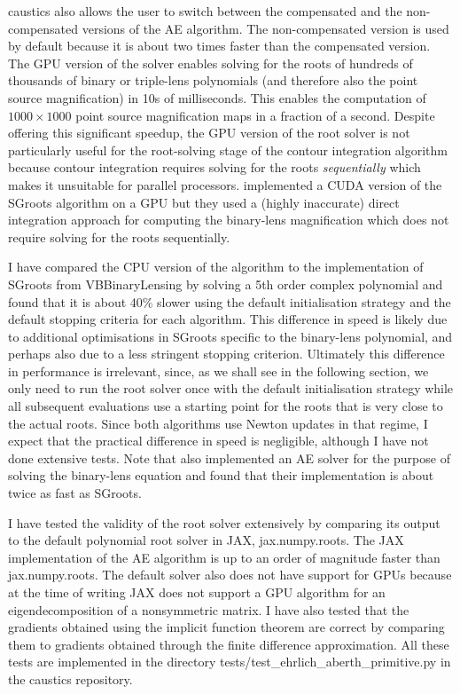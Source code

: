 \documentclass[12pt,dvipsnames]{report}
\newcommand{\ssf}[1]{\textsf{#1}}
\begin{document}
\ssf{caustics} also allows the user to switch between the compensated  and the non-compensated 
versions of the AE algorithm. The non-compensated version is used by default because 
it is about two times faster than the compensated version. The GPU version of the 
solver enables solving for the roots of hundreds of thousands of binary or triple-lens 
polynomials (and therefore also the point source magnification) in 10s of milliseconds.  
This enables the computation of $1000 \times 1000$ point source magnification maps 
in a fraction of a second. Despite offering this significant speedup, the GPU version of the 
root solver is not particularly useful for the root-solving stage of the contour integration 
algorithm because  contour integration requires solving for the roots \emph{sequentially}
which makes it unsuitable for parallel processors.
\citet{mcdougall2014} implemented a \ssf{CUDA} version of the \ssf{SGroots} algorithm 
on a GPU but they used  a (highly inaccurate) direct integration approach for 
computing the binary-lens magnification which does not require solving for the roots 
sequentially. 

I have compared the CPU version of the algorithm to the implementation of \ssf{SGroots} 
from \ssf{VBBinaryLensing} by solving a 5th order complex polynomial and found that 
it is about 40\% slower using the default initialisation strategy and the default 
stopping criteria for each algorithm. This difference in speed is likely due to additional 
optimisations in \ssf{SGroots} specific to the binary-lens polynomial, and perhaps also due 
to  a less stringent stopping criterion. Ultimately this difference in performance is 
irrelevant, since, as we shall see in the following section, we only need to run the 
root solver once  with the default initialisation strategy while all subsequent evaluations 
use a starting  point for the roots that is very close to the actual roots. 
Since both algorithms use Newton updates in that regime, I expect that the practical 
difference in speed is negligible, although I have not done extensive tests.  
Note that \citet{2022MNRAS.514.4379F} also implemented an AE solver for 
the purpose of solving the binary-lens equation and found that their implementation 
is about twice as fast as \ssf{SGroots}. 

I have tested the validity of the root solver extensively by comparing its output to the 
default polynomial root solver in \ssf{JAX}, \ssf{jax.numpy.roots}. The \ssf{JAX} 
implementation of the AE algorithm is up to an order of magnitude faster than 
\ssf{jax.numpy.roots}. The default solver also does not have support for GPUs because 
at the time of writing \ssf{JAX} does not support a GPU algorithm for an eigendecomposition 
of a nonsymmetric matrix.
I have also tested that the gradients obtained using the implicit function theorem are 
correct by comparing them to gradients obtained through the finite 
difference approximation. All these tests are implemented in the directory
\ssf{tests/test\_ehrlich\_aberth\_primitive.py} in the \ssf{caustics} repository.
\end{document}
